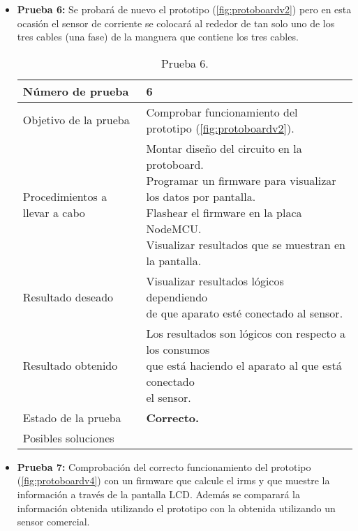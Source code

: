 \begin{itemize}
	\vspace{9.5cm}
	
	\item \textbf{Prueba 6:} Se probará de nuevo el prototipo (\ref{fig:protoboardv2}) pero en esta ocasión el sensor de corriente se colocará al rededor de tan solo uno de los tres cables (una fase) de la manguera que contiene los tres cables.
	
	\begin{table}[H]
		\begin{center}
			\begin{tabular}{|l|l|}
				\hline
				Número de prueba &  6 \\ \hline 
				Objetivo de la prueba &  Comprobar funcionamiento del prototipo (\ref{fig:protoboardv2}). \\ \hline 
				Procedimientos a llevar a cabo &  \makecell[l]{\tabitem Montar diseño del circuito en la protoboard. \\ \tabitem Programar un firmware para visualizar \\ los datos por pantalla.
					\\ \tabitem Flashear el firmware en la placa NodeMCU.
					\\ \tabitem Visualizar resultados que se muestran en la pantalla.}
				\\ \hline 
				Resultado deseado &  \makecell[l]{Visualizar resultados lógicos dependiendo \\ de que aparato esté conectado al sensor.} \\ \hline 
				Resultado obtenido &  \makecell[l]{Los resultados son lógicos con respecto a los consumos \\ que está haciendo el aparato al que está conectado \\ el sensor.} \\ \hline 
				Estado de la prueba &  \textbf{Correcto.} \\ \hline 
				Posibles soluciones &  \makecell[l]{} \\ \hline 
				
			\end{tabular}
			\caption{Prueba 6.}
			\label{tabla:prueba6}
		\end{center}
	\end{table}
	
	\vspace{10.5cm}
	
	\item \textbf{Prueba 7:} Comprobación del correcto funcionamiento del prototipo (\ref{fig:protoboardv4}) con un firmware que calcule el irms y que muestre la información a través de la pantalla LCD. Además se comparará la información obtenida utilizando el prototipo con la obtenida utilizando un sensor comercial.
	

\end{itemize}
